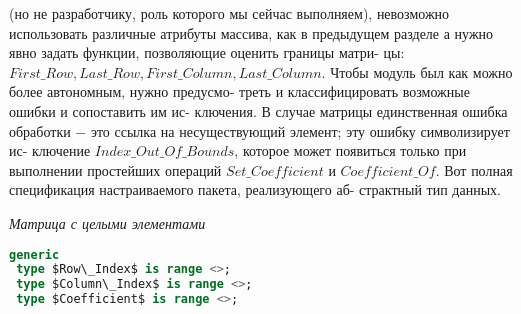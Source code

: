 \documentclass{./git_rep/mai_prac_2017/template/mai_book}
\begin{document}
(но не разработчику, роль которого мы сейчас выполняем), невозможно\linebreak
использовать различные атрибуты массива, как в предыдущем разделе\linebreak
а нужно явно задать функции, позволяющие оценить границы матри-\linebreak
цы: $First\_Row, Last\_Row, First\_Column, Last\_Column$.\newline
\hspace*{15pt}Чтобы модуль был как можно более автономным, нужно предусмо-\linebreak
треть  и  классифицировать  возможные ошибки  и  сопоставить им ис-\linebreak
ключения.  В случае матрицы единственная ошибка обработки $-$ это\linebreak
ссылка  на  несуществующий  элемент;  эту  ошибку  символизирует  ис-\linebreak
ключение $Index\_Out\_Of\_Bounds$, которое может появиться только при\linebreak
выполнении простейших операций $Set\_Coefficient$ и $Coefficient\_Of$.\newline
Вот полная спецификация настраиваемого пакета, реализующего аб-\linebreak
страктный тип данных.
\begin{center}
\textit{Матрица с целыми элементами}
\end{center}
\begin{lstlisting}[mathescape=true, language=Ada]
generic
 type $Row\_Index$ is range <>;
 type $Column\_Index$ is range <>;
 type $Coefficient$ is range <>;
\end{lstlisting}
\newpage
\end{document}
